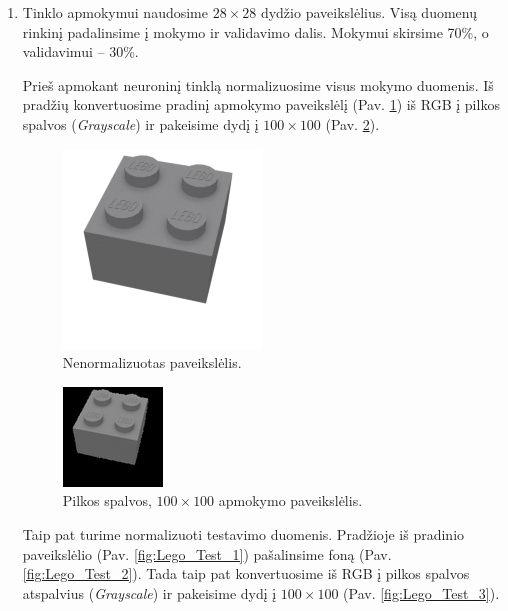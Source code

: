 \documentclass{VUMIFInfKursinis}
\begin{document}
\begin{enumerate} 

    \item Tinklo apmokymui naudosime $28\times28$ dydžio paveikslėlius. Visą duomenų rinkinį padalinsime į mokymo ir validavimo dalis. Mokymui skirsime 70\%, o validavimui -- 30\%.
    
    Prieš apmokant neuroninį tinklą normalizuosime visus mokymo duomenis. Iš pradžių konvertuosime pradinį apmokymo paveikslėlį (Pav. \ref{fig:Lego_Train_1}) iš RGB į pilkos spalvos (\textit{Grayscale}) ir pakeisime dydį į $100\times100$ (Pav. \ref{fig:Lego_Train_2}).
    
    \begin{figure}[h!]
    \centering
      \includegraphics[scale=0.8]{img/lego_train_1}
      \caption{Nenormalizuotas paveikslėlis.}
      \label{fig:Lego_Train_1}
    \end{figure}

    \begin{figure}[h!]
    \centering
      \includegraphics[scale=1.3]{img/lego_train_2}
      \caption{Pilkos spalvos, $100\times100$ apmokymo paveikslėlis.}
      \label{fig:Lego_Train_2}
    \end{figure}
    
    \newpage
    Taip pat turime normalizuoti testavimo duomenis. Pradžioje iš pradinio paveikslėlio (Pav. \ref{fig:Lego_Test_1}) pašalinsime foną (Pav. \ref{fig:Lego_Test_2}). Tada taip pat konvertuosime iš RGB į pilkos spalvos atspalvius (\textit{Grayscale}) ir pakeisime dydį į $100\times100$ (Pav. \ref{fig:Lego_Test_3}).
    

\end{enumerate}
\end{document}
